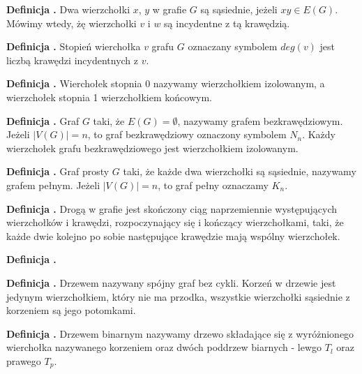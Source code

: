 \noindent
\textbf{Definicja \graphDefinitionIndex.}
\incrementGraphDefinitionIndex
Dwa wierzchołki $x$, $y$ w grafie $G$ są sąsiednie, jeżeli $xy \in E(G)$.
Mówimy wtedy, żę wierzchołki $v$ i $w$ są incydentne z tą krawędzią.

\noindent
\textbf{Definicja \graphDefinitionIndex.}
\incrementGraphDefinitionIndex
Stopień wierchołka $v$ grafu $G$ oznaczany symbolem $deg(v)$ jest liczbą krawędzi incydentnych z $v$.

\noindent
\textbf{Definicja \graphDefinitionIndex.}
\incrementGraphDefinitionIndex
Wierchołek stopnia 0 nazywamy wierzchołkiem izolowanym, a wierzchołek stopnia 1 wierzchołkiem końcowym.

\noindent
\textbf{Definicja \graphDefinitionIndex.}
\incrementGraphDefinitionIndex
Graf $G$ taki, że $E(G) = \emptyset$, nazywamy grafem bezkrawędziowym. Jeżeli $|V(G)| = n$, to graf bezkrawędziowy oznaczony symbolem $N_n$.
Każdy wierzchołek grafu bezkrawędziowego jest wierzchołkiem izolowanym.

\noindent
\textbf{Definicja \graphDefinitionIndex.}
\incrementGraphDefinitionIndex
Graf prosty $G$ taki, że każde dwa wierzchołki są sąsiednie, nazywamy grafem pełnym.
Jeżeli $|V(G)| = n$, to graf pełny oznaczamy $K_n$.

\noindent
\textbf{Definicja \graphDefinitionIndex.}
\incrementGraphDefinitionIndex
Drogą w grafie jest skończony ciąg naprzemiennie występujących wierzchołków i krawędzi, rozpoczynający się
i kończący wierzchołkami, taki, że każde dwie kolejno po sobie następujące krawędzie mają wspólny wierzchołek.

\noindent
\textbf{Definicja \graphDefinitionIndex.}
\incrementGraphDefinitionIndex

\noindent
\textbf{Definicja \graphDefinitionIndex.}
\incrementGraphDefinitionIndex
Drzewem nazywany spójny graf bez cykli. Korzeń w drzewie jest jedynym wierzchołkiem,
który nie ma przodka, wszystkie wierzchołki sąsiednie z korzeniem są jego potomkami.

\noindent
\textbf{Definicja \graphDefinitionIndex.}
\incrementGraphDefinitionIndex
Drzewem binarnym nazywamy drzewo składające się z wyróżnionego wierchołka nazywanego korzeniem oraz dwóch poddrzew biarnych
- lewgo $T_l$ oraz prawego $T_p$.